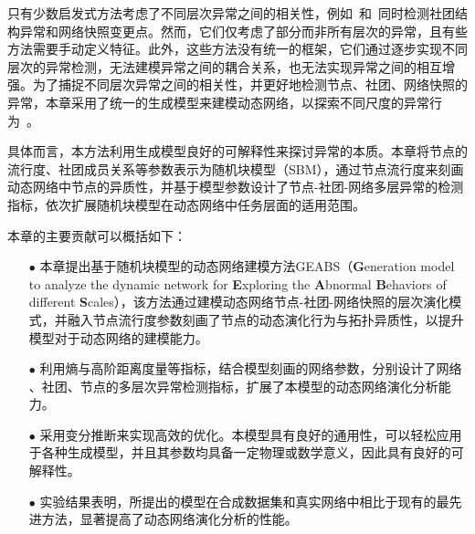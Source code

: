 只有少数启发式方法考虑了不同层次异常之间的相关性，例如~\cite{hulovatyy2016scout}和~\cite{cheung2020simultaneous}同时检测社团结构异常和网络快照变更点。然而，它们仅考虑了部分而非所有层次的异常，且有些方法需要手动定义特征。此外，这些方法没有统一的框架，它们通过逐步实现不同层次的异常检测，无法建模异常之间的耦合关系，也无法实现异常之间的相互增强。为了捕捉不同层次异常之间的相关性，并更好地检测节点、社团、网络快照的异常，本章采用了统一的生成模型来建模动态网络，以探索不同尺度的异常行为~\cite{wang2019nodes,cheng2008robust,darst2016detection}。 



具体而言，本方法利用生成模型良好的可解释性来探讨异常的本质。本章将节点的流行度、社团成员关系等参数表示为随机块模型（SBM），通过节点流行度来刻画动态网络中节点的异质性，并基于模型参数设计了节点-社团-网络多层异常的检测指标，依次扩展随机块模型在动态网络中任务层面的适用范围。

本章的主要贡献可以概括如下：


\begin{itemize} 
    \item[$\bullet$] 本章提出基于随机块模型的动态网络建模方法GEABS（\textbf{G}eneration model to analyze the dynamic network for \textbf{E}xploring the \textbf{A}bnormal \textbf{B}ehaviors of different \textbf{S}cales），该方法通过建模动态网络节点-社团-网络快照的层次演化模式，并融入节点流行度参数刻画了节点的动态演化行为与拓扑异质性，以提升模型对于动态网络的建模能力。
    \item[$\bullet$] 利用熵与高阶距离度量等指标，结合模型刻画的网络参数，分别设计了网络 、社团、节点的多层次异常检测指标，扩展了本模型的动态网络演化分析能力。
    \item[$\bullet$] 采用变分推断来实现高效的优化。本模型具有良好的通用性，可以轻松应用于各种生成模型，并且其参数均具备一定物理或数学意义，因此具有良好的可解释性。 
    \item[$\bullet$] 实验结果表明，所提出的模型在合成数据集和真实网络中相比于现有的最先进方法，显著提高了动态网络演化分析的性能。
\end{itemize}


